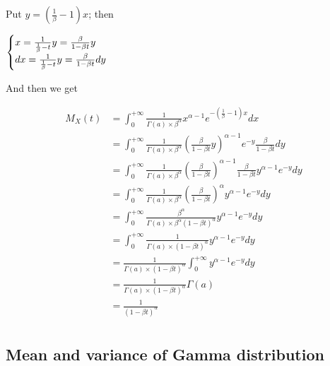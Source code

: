 \documentclass[11pt]{article}
\begin{document}
Put $y=(\frac{1}{\beta}-1)x$; then 

$\begin{cases}
x=\frac{1}{\frac{1}{\beta}-t}y=\frac{\beta}{1-\beta t}y \\
dx=\frac{1}{\frac{1}{\beta}-t}y=\frac{\beta}{1-\beta t}dy \\
            
\end{cases}\\ $  

And then we get 

\begin{align*}
M_X(t)
&=\int_{0}^{+\infty}\frac{1}{\Gamma(a)\times \beta ^\alpha} x^{\alpha-1}e^{-(\frac{1}{\beta}-1)x}dx\\
&=\int_{0}^{+\infty}\frac{1}{\Gamma(a)\times \beta ^\alpha} {(\frac{\beta}{1-\beta t}y) }^{\alpha-1}e^{-y}\frac{\beta}{1-\beta t}dy\\
&=\int_{0}^{+\infty}\frac{1}{\Gamma(a)\times \beta ^\alpha} {(\frac{\beta}{1-\beta t}) }^{\alpha-1}\frac{\beta}{1-\beta t} y ^{\alpha-1}e^{-y}dy\\
&=\int_{0}^{+\infty}\frac{1}{\Gamma(a)\times \beta ^\alpha} {(\frac{\beta}{1-\beta t}) }^{\alpha} y^{\alpha-1} e^{-y}dy\\
&=\int_{0}^{+\infty}\frac{\beta^\alpha}{\Gamma(a)\times \beta ^\alpha (1-\beta t)^\alpha} y^{\alpha-1} e^{-y}dy\\
&=\int_{0}^{+\infty}\frac{1}{\Gamma(a)\times (1-\beta t)^\alpha} y^{\alpha-1} e^{-y}dy\\
&=\frac{1}{\Gamma(a)\times (1-\beta t)^\alpha}\int_{0}^{+\infty} y^{\alpha-1} e^{-y}dy\\
&=\frac{1}{\Gamma(a)\times (1-\beta t)^\alpha}\Gamma(a) \\
&=\frac{1}{(1-\beta t)^\alpha} \\
\end{align*}    


\subsection{Mean and variance of Gamma distribution}
\end{document}
